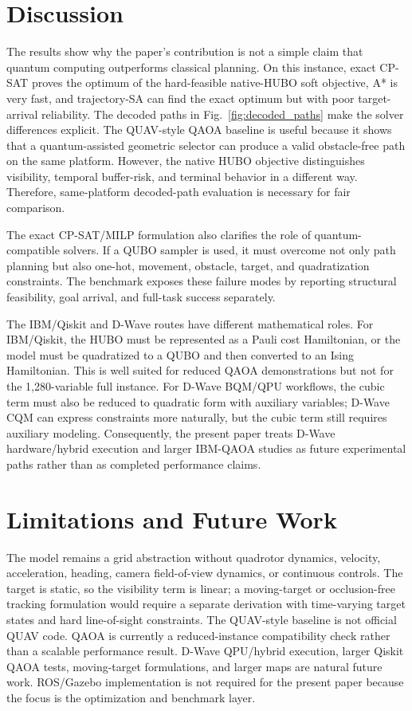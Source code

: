\documentclass[10pt,conference]{IEEEtran}
\begin{document}
\FloatBarrier
\section{Discussion}
The results show why the paper's contribution is not a simple claim that quantum computing outperforms classical planning. On this instance, exact CP-SAT proves the optimum of the hard-feasible native-HUBO soft objective, A* is very fast, and trajectory-SA can find the exact optimum but with poor target-arrival reliability. The decoded paths in Fig.~\ref{fig:decoded_paths} make the solver differences explicit. The QUAV-style QAOA baseline is useful because it shows that a quantum-assisted geometric selector can produce a valid obstacle-free path on the same platform. However, the native HUBO objective distinguishes visibility, temporal buffer-risk, and terminal behavior in a different way. Therefore, same-platform decoded-path evaluation is necessary for fair comparison.

The exact CP-SAT/MILP formulation also clarifies the role of quantum-compatible solvers. If a QUBO sampler is used, it must overcome not only path planning but also one-hot, movement, obstacle, target, and quadratization constraints. The benchmark exposes these failure modes by reporting structural feasibility, goal arrival, and full-task success separately.

The IBM/Qiskit and D-Wave routes have different mathematical roles. For IBM/Qiskit, the HUBO must be represented as a Pauli cost Hamiltonian, or the model must be quadratized to a QUBO and then converted to an Ising Hamiltonian. This is well suited for reduced QAOA demonstrations but not for the 1,280-variable full instance. For D-Wave BQM/QPU workflows, the cubic term must also be reduced to quadratic form with auxiliary variables; D-Wave CQM can express constraints more naturally, but the cubic term still requires auxiliary modeling. Consequently, the present paper treats D-Wave hardware/hybrid execution and larger IBM-QAOA studies as future experimental paths rather than as completed performance claims.

\section{Limitations and Future Work}
The model remains a grid abstraction without quadrotor dynamics, velocity, acceleration, heading, camera field-of-view dynamics, or continuous controls. The target is static, so the visibility term is linear; a moving-target or occlusion-free tracking formulation would require a separate derivation with time-varying target states and hard line-of-sight constraints. The QUAV-style baseline is not official QUAV code. QAOA is currently a reduced-instance compatibility check rather than a scalable performance result. D-Wave QPU/hybrid execution, larger Qiskit QAOA tests, moving-target formulations, and larger maps are natural future work. ROS/Gazebo implementation is not required for the present paper because the focus is the optimization and benchmark layer.
\end{document}
